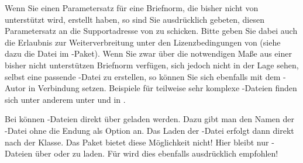 Wenn Sie einen Parametersatz für eine Briefnorm, die bisher nicht von
\KOMAScript{} unterstützt wird, erstellt haben, so sind Sie ausdrücklich
gebeten, diesen Parametersatz an die Supportadresse von \KOMAScript{} zu
schicken. Bitte geben Sie dabei auch die Erlaubnis zur Weiterverbreitung unter
den Lizenzbedingungen von \KOMAScript{} (siehe dazu die Datei
\href{https://mirrors.ctan.org/macros/latex/contrib/koma-script/doc/lppl-de.txt}%
{} im \KOMAScript-Paket). Wenn Sie zwar über die notwendigen
Maße aus einer bisher nicht unterstützen Briefnorm verfügen, sich jedoch nicht
in der Lage sehen, selbst eine passende -Datei zu erstellen, so
können Sie sich ebenfalls mit dem \KOMAScript-Autor in Verbindung
setzen. Beispiele für teilweise sehr komplexe -Dateien finden sich
unter anderem unter \cite{wiki-de} und in \cite{DANTE:TK0203:MJK}.


\begin{Declaration}
\end{Declaration}
Bei  können -Dateien direkt
über  geladen werden. Dazu gibt man den
Namen der -Datei ohne die Endung als Option an. Das
Laden der -Datei erfolgt dann direkt nach der Klasse. Das Paket
 bietet diese Möglichkeit nicht! Hier
bleibt nur -Dateien über 
oder  zu
laden. Für  wird dies ebenfalls
ausdrücklich empfohlen!

